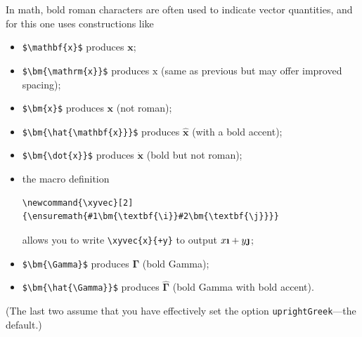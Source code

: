 \documentclass[11pt]{article}
\theoremstyle{oldplain}
\theoremstyle{plain}
\begin{document}
In math, bold roman characters are often used to indicate vector quantities, and for this one uses constructions like 
\begin{itemize}
\item
\verb|$\mathbf{x}$| produces $\mathbf{x}$;
\item
\verb|$\bm{\mathrm{x}}$| produces $\bm{\mathrm{x}}$ (same as previous but may offer improved spacing);
\item
\verb|$\bm{x}$| produces $\bm{x}$ (not roman);
\item
\verb|$\bm{\hat{\mathbf{x}}}$| produces $\bm{\hat{\mathbf{x}}}$ (with a bold accent);
\item \verb|$\bm{\dot{x}}$| produces $\bm{\dot{x}}$ (bold but not roman);
\item the macro definition
\begin{verbatim}
\newcommand{\xyvec}[2]{\ensuremath{#1\bm{\textbf{\i}}#2\bm{\textbf{\j}}}}
\end{verbatim}
allows you to write \verb|\xyvec{x}{+y}| to output $\xyvec{x}{+y}$;
\item \verb|$\bm{\Gamma}$| produces $\bm{\Gamma}$ (bold Gamma);
\item \verb|$\bm{\hat{\Gamma}}$| produces $\bm{\hat{\Gamma}}$ (bold Gamma with bold accent).
\end{itemize}
(The last two assume that you have effectively set the option {\tt uprightGreek}---the default.)
\end{document}
